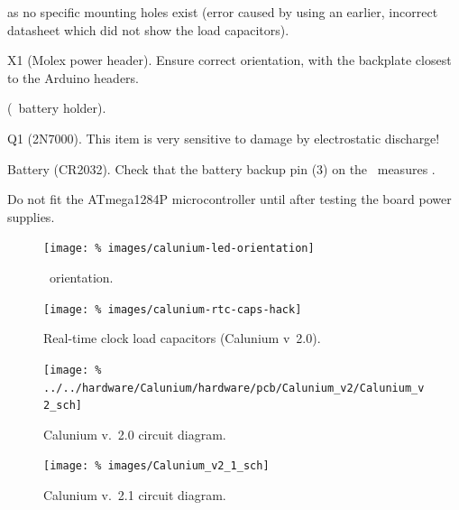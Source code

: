 \begin{buildorder}
  as no specific mounting holes exist (error caused by using an
  earlier, incorrect datasheet which did not show the load
  capacitors).
\item X1 (Molex power header). Ensure correct orientation, with the
  backplate closest to the Arduino headers.
\item {} (\rtc\ battery holder).
\item Q1 (2N7000). This item is very sensitive to damage by
  electrostatic discharge!
\item Battery (CR2032). Check that the battery backup pin (3) on the
  \rtc\ measures .
\item {}
\end{buildorder}
Do not fit the ATmega1284P microcontroller until after testing the
board power supplies.

\begin{figure}
  \centering
  \texttt{[image: \%
    images/calunium-led-orientation]}
  \caption[LED orientation]{\led\ orientation. }
  \label{fig:led-orientation}
\end{figure}
\begin{figure}
  \centering
  \texttt{[image: \%
    images/calunium-rtc-caps-hack]}
  \caption[Real-time clock load capacitors (Calunium v~2.0)]{%
    Real-time clock load capacitors (Calunium v~2.0). }
  \label{fig:calunium-rtc-caps-hack}
\end{figure}


\begin{landscape}
  \begin{figure}[p]
    \centering
    \texttt{[image: \%
      ../../hardware/Calunium/hardware/pcb/Calunium\_v2/Calunium\_v2\_sch]}  
    \caption{Calunium v.~2.0 circuit diagram.}
    \label{fig:calunium-v2.0-cct-diag}
  \end{figure}
  \begin{figure}[p]
    \centering
    \texttt{[image: \%
      images/Calunium\_v2\_1\_sch]}
    \caption{Calunium v.~2.1 circuit diagram.}
    \label{fig:calunium-v2.1-cct-diag}
  \end{figure}
\end{landscape}

